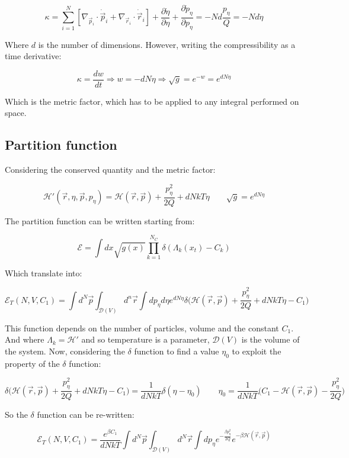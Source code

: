 	$$\kappa = \sum\limits_{i=1}^N[\nabla_{\vec{p}_i}\cdot\dot{\vec{p}}_i + \nabla_{\vec{r}_i}\cdot\dot{\vec{r}}_i] + \frac{\partial\dot{\eta}}{\partial\eta} + \frac{\partial\dot{p}_\eta}{\partial p_\eta} = -Nd\frac{p_\eta}{Q} = -Nd\dot{\eta}$$

	Where $d$ is the number of dimensions.
	However, writing the compressibility as a time derivative:

	$$\kappa = \frac{dw}{dt}\Rightarrow w = -dN\eta\Rightarrow\sqrt{g} = e^{-w} = e^{dN\eta}$$

	Which is the metric factor, which has to be applied to any integral performed on space.

	\subsection{Partition function}
	Considering the conserved quantity and the metric factor:

	$$\mathcal{H}'(\vec{r}, \eta, \vec{p}, p_\eta) = \mathcal{H}(\vec{r}, \vec{p}) + \frac{p_\eta^2}{2Q} + dNkT\eta\qquad \sqrt{g} = e^{dN\eta}$$

	The partition function can be written starting from:

	$$\mathcal{E} = \int dx\sqrt{g(x)}\prod\limits_{k=1}^{N_C}\delta(\Lambda_k(x_t) - C_k)$$

	Which translate into:

	$$\mathcal{E}_T(N, V, C_1) = \int d^N\vec{p}\int_{\mathcal{D}(V)}d^n\vec{r}\int dp_\eta d\eta e^{dN\eta}\delta\biggl(\mathcal{H}(\vec{r}, \vec{p}) + \frac{p_\eta^2}{2Q} + dNkT\eta - C_1\biggr)$$

	This function depends on the number of particles, volume and the constant $C_1$.
	And where $\Lambda_k = \mathcal{H}'$ and so temperature is a parameter, $\mathcal{D}(V)$ is the volume of the system.
	Now, considering the $\delta$ function to find a value $\eta_0$ to exploit the property of the $\delta$ function:

	$$\delta\biggl(\mathcal{H}(\vec{r}, \vec{p}) + \frac{p_\eta^2}{2Q} + dNkT\eta - C_1\biggr) = \frac{1}{dNkT}\delta(\eta-\eta_0)\qquad \eta_0 = \frac{1}{dNkT}\biggl(C_1-\mathcal{H}(\vec{r}, \vec{p}) - \frac{p_\eta^2}{2Q}\biggr)$$

	So the $\delta$ function can be re-written:

	$$\mathcal{E}_T(N, V, C_1) = \frac{e^{\beta C_1}}{dNkT}\int d^N\vec{p}\int_{\mathcal{D}(V)}d^N\vec{r}\int dp_\eta e^{-\frac{\beta p_\eta^2}{2Q}}e^{-\beta\mathcal{H}(\vec{r}, \vec{p})}$$

